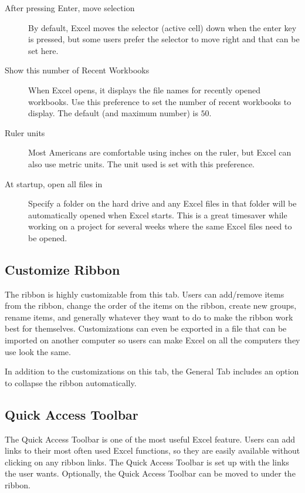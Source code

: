 	\begin{description}
		\item[After pressing Enter, move selection] By default, Excel moves the selector (active cell) down when the enter key is pressed, but some users prefer the selector to move right and that can be set here.
		\item[Show this number of Recent Workbooks] When Excel opens, it displays the file names for recently opened workbooks. Use this preference to set the number of recent workbooks to display. The default (and maximum number) is $ 50 $.
		\item[Ruler units] Most Americans are comfortable using inches on the ruler, but Excel can also use metric units. The unit used is set with this preference.
		\item[At startup, open all files in] Specify a folder on the hard drive and any Excel files in that folder will be automatically opened when Excel starts. This is a great timesaver while working on a project for several weeks where the same Excel files need to be opened.
	\end{description}
	
\subsection{Customize Ribbon}

The ribbon is highly customizable from this tab. Users can add/remove items from the ribbon, change the order of the items on the ribbon, create new groups, rename items, and generally whatever they want to do to make the ribbon work best for themselves. Customizations can even be exported in a file that can be imported on another computer so users can make Excel on all the computers they use look the same.

In addition to the customizations on this tab, the General Tab includes an option to collapse the ribbon automatically.

\subsection{Quick Access Toolbar}

The Quick Access Toolbar is one of the most useful Excel feature. Users can add links to their most often used Excel functions, so they are easily available without clicking on any ribbon links. The Quick Access Toolbar is set up with the links the user wants. Optionally, the Quick Access Toolbar can be moved to under the ribbon.

